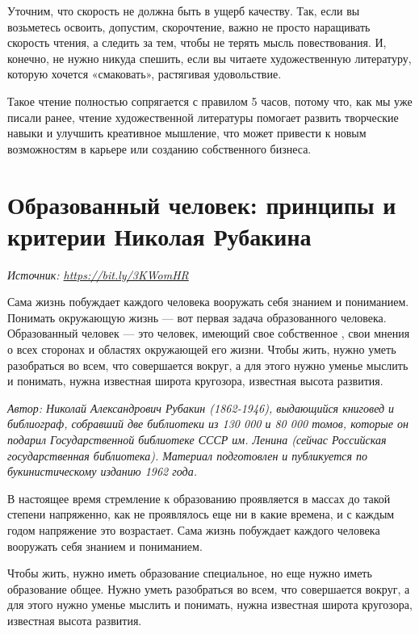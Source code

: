 Уточним, что скорость не должна быть в ущерб качеству. Так, если вы возьметесь освоить, допустим, скорочтение, важно не просто наращивать скорость чтения, а следить за тем, чтобы не терять мысль повествования. И, конечно, не нужно никуда спешить, если вы читаете художественную литературу, которую хочется «смаковать», растягивая удовольствие.

Такое чтение полностью сопрягается с правилом 5 часов, потому что, как мы уже писали ранее, чтение художественной литературы помогает развить творческие навыки и улучшить креативное мышление, что может привести к новым возможностям в карьере или созданию собственного бизнеса.

\clearpage

\section{Образованный человек: принципы и критерии Николая Рубакина}


\textit{Источник: \url{https://bit.ly/3KWomHR}}

\begin{fancyquotes}
    Сама жизнь побуждает каждого человека вооружать себя знанием и пониманием. Понимать окружающую жизнь --- вот первая задача образованного человека. Образованный человек --- это человек, имеющий свое собственное , свои мнения о всех сторонах и областях окружающей его жизни. Чтобы жить, нужно уметь разобраться во всем, что совершается вокруг, а для этого нужно уменье мыслить и понимать, нужна известная широта кругозора, известная высота развития.
\end{fancyquotes}


\textit{Автор: Николай Александрович Рубакин (1862-1946), выдающийся книговед и библиограф, собравший две библиотеки из 130 000 и 80 000 томов, которые он подарил Государственной библиотеке СССР им. Ленина (сейчас Российская государственная библиотека). Материал подготовлен и публикуется по букинистическому изданию 1962 года.}

В настоящее время стремление к образованию проявляется в массах до такой степени напряженно, как не проявлялось еще ни в какие времена, и с каждым годом напряжение это возрастает. Сама жизнь побуждает каждого человека вооружать себя знанием и пониманием.

Чтобы жить, нужно иметь образование специальное, но еще нужно иметь образование общее. Нужно уметь разобраться во всем, что совершается вокруг, а для этого нужно уменье мыслить и понимать, нужна известная широта кругозора, известная высота развития.

